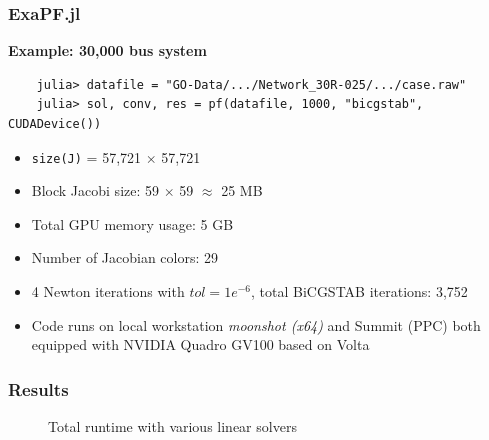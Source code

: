 \begin{frame}[fragile]
  \frametitle{ExaPF.jl}
  {\bf Example: 30,000 bus system}
  \begin{lstlisting}
    julia> datafile = "GO-Data/.../Network_30R-025/.../case.raw"
    julia> sol, conv, res = pf(datafile, 1000, "bicgstab", CUDADevice())
  \end{lstlisting}
  \begin{itemize}
    \item \lstinline{size(J)} = 57,721 $\times$ 57,721 
    \item Block Jacobi size: 59 $\times$ 59 $\approx$ 25 MB
    \item Total GPU memory usage: 5 GB
    \item Number of Jacobian colors: 29
    \item 4 Newton iterations with $tol = 1e^{-6}$, total BiCGSTAB iterations: 3,752 
    \item Code runs on local workstation {\it moonshot (x64)} and Summit (PPC) both equipped with NVIDIA Quadro GV100 based on Volta 
  \end{itemize}
\end{frame}

\begin{frame}[fragile]
  \frametitle{Results}
  \begin{figure}
\caption{Total runtime with various linear solvers}
\label{fig:totalruntime}
\end{figure}
\end{frame}


